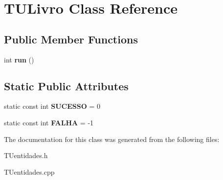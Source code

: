 \hypertarget{classTULivro}{}\section{T\+U\+Livro Class Reference}
\label{classTULivro}
\subsection*{Public Member Functions}
\begin{DoxyCompactItemize}
\item 
\mbox{\label{classTULivro_ab5966f07d89cd055f1cb35bdf0769169}} 
int {\bfseries run} ()
\end{DoxyCompactItemize}
\subsection*{Static Public Attributes}
\begin{DoxyCompactItemize}
\item 
\mbox{\label{classTULivro_a9f66d4598c6c74fea2b06b77e0e1e340}} 
static const int {\bfseries S\+U\+C\+E\+S\+SO} = 0
\item 
\mbox{\label{classTULivro_a15c83153ff3decb1066d41d50c7429c6}} 
static const int {\bfseries F\+A\+L\+HA} = -\/1
\end{DoxyCompactItemize}


The documentation for this class was generated from the following files\+:\begin{DoxyCompactItemize}
\item 
T\+Uentidades.\+h\item 
T\+Uentidades.\+cpp\end{DoxyCompactItemize}
